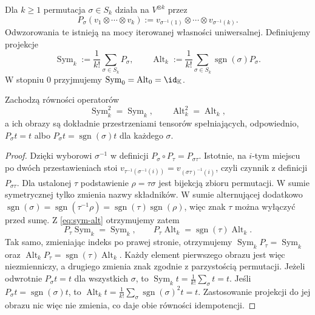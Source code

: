 \begin{definicja}
\label{def:sym-alt}
Dla $k\geq1$ permutacja $\sigma\in S_k$ działa na
$V^{\otimes k}$ przez
\[
 P_\sigma(v_1\otimes\cdots\otimes v_k)
 :=v_{\sigma^{-1}(1)}\otimes\cdots\otimes v_{\sigma^{-1}(k)}.
\]
Odwzorowania te istnieją na mocy iterowanej własności uniwersalnej.
Definiujemy projekcje
\begin{equation}\label{eq:sym-alt}
 \operatorname{Sym}_k:=\frac1{k!}\sum_{\sigma\in S_k}P_\sigma,
 \qquad
 \operatorname{Alt}_k:=\frac1{k!}\sum_{\sigma\in S_k}
\operatorname{sgn}(\sigma)P_\sigma.
\end{equation}
W stopniu $0$ przyjmujemy
$\operatorname{Sym}_0=\operatorname{Alt}_0=\id_{\mathbb K}$.
\end{definicja}

\begin{twierdzenie}
\label{thm:sym-alt}
 Zachodzą równości operatorów
\[
 \operatorname{Sym}_k^2=\operatorname{Sym}_k,\qquad
 \operatorname{Alt}_k^2=\operatorname{Alt}_k,
\]
a ich obrazy są dokładnie przestrzeniami tensorów spełniających,
odpowiednio, $P_\sigma t=t$ albo
$P_\sigma t=\operatorname{sgn}(\sigma)t$ dla każdego $\sigma$.
\end{twierdzenie}
\begin{proof}
Dzięki wyborowi $\sigma^{-1}$ w definicji
$P_\sigma\circ P_\tau=P_{\sigma\tau}$.
Istotnie, na $i$-tym miejscu po dwóch przestawieniach
stoi $v_{\tau^{-1}(\sigma^{-1}(i))}
=v_{(\sigma\tau)^{-1}(i)}$, czyli czynnik z definicji
$P_{\sigma\tau}$.
Dla ustalonej $\tau$ podstawienie
$\rho=\tau\sigma$ jest bijekcją zbioru permutacji.
W sumie symetrycznej tylko zmienia nazwy składników.
W sumie alternującej dodatkowo
$\operatorname{sgn}(\sigma)
=\operatorname{sgn}(\tau^{-1}\rho)
=\operatorname{sgn}(\tau)\operatorname{sgn}(\rho)$,
więc znak $\tau$ można wyłączyć przed sumę.
Z \eqref{eq:sym-alt} otrzymujemy zatem
\[
 P_\tau\operatorname{Sym}_k=\operatorname{Sym}_k,
 \qquad
 P_\tau\operatorname{Alt}_k
 =\operatorname{sgn}(\tau)\operatorname{Alt}_k.
\]
Tak samo, zmieniając indeks po prawej stronie, otrzymujemy
$\operatorname{Sym}_kP_\tau=\operatorname{Sym}_k$ oraz
$\operatorname{Alt}_kP_\tau=\operatorname{sgn}(\tau)\operatorname{Alt}_k$.
Każdy element pierwszego obrazu jest więc niezmienniczy,
a drugiego zmienia znak zgodnie z parzystością permutacji.
Jeżeli odwrotnie $P_\sigma t=t$ dla wszystkich $\sigma$,
to $\operatorname{Sym}_k t=\frac1{k!}\sum_\sigma t=t$.
Jeśli $P_\sigma t=\operatorname{sgn}(\sigma)t$, to
$\operatorname{Alt}_k t=
\frac1{k!}\sum_\sigma\operatorname{sgn}(\sigma)^2t=t$.
Zastosowanie projekcji do jej obrazu nic więc nie zmienia,
co daje obie równości idempotencji.
\end{proof}

